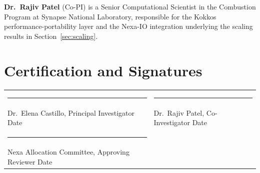 \documentclass[11pt,a4paper]{scrartcl}
\begin{document}
\textbf{Dr.\ Rajiv Patel} (Co-PI) is a Senior Computational Scientist in the Combustion Program at Synapse National Laboratory, responsible for the Kokkos performance-portability layer and the Nexa-IO integration underlying the scaling results in Section~\ref{sec:scaling}.

\vspace{10pt}
\section*{Certification and Signatures}
\noindent
\begin{tabular}{@{}p{7.3cm}p{7.3cm}@{}}
\rule{7cm}{0.4pt} & \rule{7cm}{0.4pt} \\
Dr.\ Elena Castillo, Principal Investigator \quad Date & Dr.\ Rajiv Patel, Co-Investigator \quad Date \\[18pt]
\rule{7cm}{0.4pt} & \\
Nexa Allocation Committee, Approving Reviewer \quad Date & \\
\end{tabular}
\end{document}
